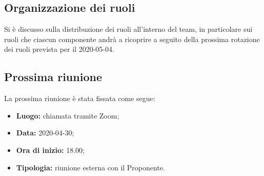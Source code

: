 	\subsection{Organizzazione dei ruoli}
		Si è discusso sulla distribuzione dei ruoli all'interno del team, in particolare sui ruoli che ciascun componente andrà a ricoprire a seguito della prossima rotazione dei ruoli prevista per il 2020-05-04.
		
	\subsection{Prossima riunione}
		La prossima riunione è stata fissata come segue:
		\begin{itemize}
			\item \textbf{Luogo: } chiamata tramite Zoom; 
			\item \textbf{Data: } 2020-04-30;
			\item \textbf{Ora di inizio: } 18.00;
			\item \textbf{Tipologia: } riunione esterna con il Proponente.
		\end{itemize}

